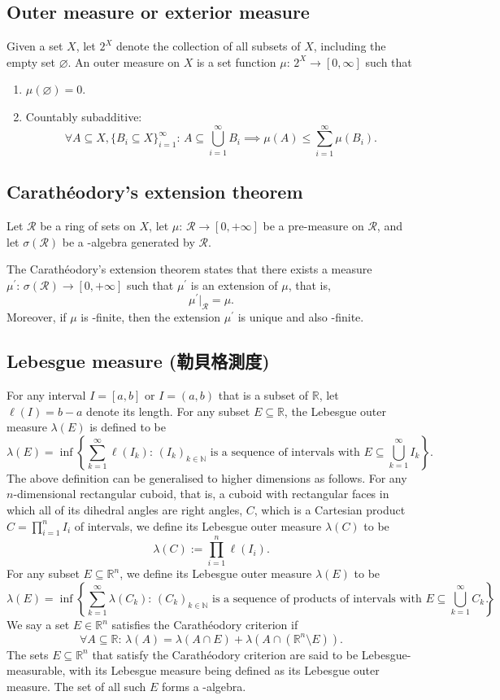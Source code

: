 \documentclass[a4paper,12pt]{article}
\begin{document}
\subsection{Outer measure or exterior measure}
Given a set $X$, let $2^X$ denote the collection of all subsets of $X$, including the empty set $\varnothing$. An outer measure on $X$ is a set function $\mu:\,2^X\to [0,\infty]$ such that
\begin{enumerate}
\item $\mu(\varnothing )=0$.
\item Countably subadditive: 
\[\forall A\subseteq X,\{B_i\subseteq X\}_{i=1}^\infty:\,A\subseteq\bigcup_{i=1}^\infty B_i\implies\mu(A)\leq\sum_{i=1}^\infty\mu(B_i).\]
\end{enumerate}
\subsection{Carathéodory's extension theorem}
Let $\mathcal{R}$ be a ring of sets on $X$, let $\mu:\,\mathcal{R}\to [0,+\infty]$ be a pre-measure on $\mathcal{R}$, and let $\sigma(\mathcal{R})$ be a \text{\textsigma}-algebra generated by $\mathcal{R}$.

The Carathéodory's extension theorem states that there exists a measure $\mu^\prime:\,\sigma(\mathcal{R})\to [0,+\infty]$ such that $\mu^\prime$ is an extension of $\mu$, that is, 
\[\mu^\prime\big\vert_{\mathcal{R}}=\mu.\]
Moreover, if $\mu$ is \text{\textsigma}-finite, then the extension $\mu^\prime$ is unique and also \text{\textsigma}-finite.
\subsection{Lebesgue measure (勒貝格測度)}
For any interval $I=[a,b]$ or $I=(a,b)$ that is a subset of $\mathbb{R}$, let $\ell (I)=b-a$ denote its length. For any subset $E\subseteq\mathbb{R}$, the Lebesgue outer measure $\lambda(E)$ is defined to be
\[\lambda(E)=\inf\left\{\sum_{k=1}^\infty\ell(I_k):\,(I_k)_{k\in\mathbb{N}}\text{ is a sequence of intervals with }E\subseteq\bigcup_{k=1}^\infty I_k\right\}.\]
The above definition can be generalised to higher dimensions as follows. For any $n$-dimensional rectangular cuboid, that is, a cuboid with rectangular faces in which all of its dihedral angles are right angles, $C$, which is a Cartesian product $C=\prod_{i=1}^nI_i$ of intervals, we define its Lebesgue outer measure $\lambda(C)$ to be
\[\lambda(C):=\prod_{i=1}^n\ell(I_i).\]
For any subset $E\subseteq\mathbb{R}^n$, we define its Lebesgue outer measure $\lambda(E)$ to be
\[\lambda(E)=\inf\left\{\sum _{k=1}^\infty\lambda(C_k):\,(C_k)_{k\in\mathbb{N}}\text{ is a sequence of products of intervals with }E\subseteq\bigcup_{k=1}^\infty C_k\right\}.\]
We say a set $E\in\mathbb{R}^n$ satisfies the Carathéodory criterion if 
\[\forall A\subseteq \mathbb {R}:\,\lambda(A)=\lambda(A\cap E)+\lambda(A\cap (\mathbb{R}^n\setminus E)).\]
The sets $E\subseteq\mathbb{R}^n$ that satisfy the Carathéodory criterion are said to be Lebesgue-measurable, with its Lebesgue measure being defined as its Lebesgue outer measure. The set of all such $E$ forms a \text{\textsigma}-algebra.
\end{document}
